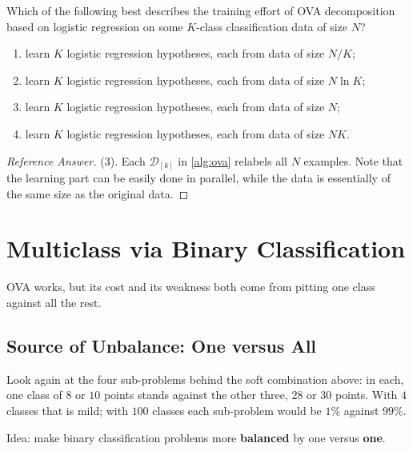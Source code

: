 \begin{exercise}
    Which of the following best describes the training effort of OVA
    decomposition based on logistic regression on some \(K\)-class
    classification data of size \(N\)?
    \begin{enumerate}[(1)]
        \item learn \(K\) logistic regression hypotheses, each from data of
            size \(N/K\);
        \item learn \(K\) logistic regression hypotheses, each from data of
            size \(N \ln K\);
        \item learn \(K\) logistic regression hypotheses, each from data of
            size \(N\);
        \item learn \(K\) logistic regression hypotheses, each from data of
            size \(NK\).
    \end{enumerate}
\end{exercise}

\begin{proof}[Reference Answer]
    (3). Each \(\mathcal{D}_{[k]}\) in \autoref{alg:ova} relabels all \(N\)
    examples. Note that the learning part can be easily done in parallel, while
    the data is essentially of the same size as the original data.
\end{proof}

\section{Multiclass via Binary Classification}\label{sec:multi-binary}


OVA works, but its cost and its weakness both come from pitting one class
against all the rest.

\subsection{Source of Unbalance: One versus All}

Look again at the four sub-problems behind the soft combination above: in each,
one class of \(8\) or \(10\) points stands against the other three, \(28\) or
\(30\) points. With \(4\) classes that is mild; with \(100\) classes each
sub-problem would be \(1\%\) against \(99\%\).

\begin{moral}
    Idea: make binary classification problems more
    \textcolor{orange!85!black}{\textbf{balanced}} by one versus
    \textcolor{orange!85!black}{\textbf{one}}.
\end{moral}

